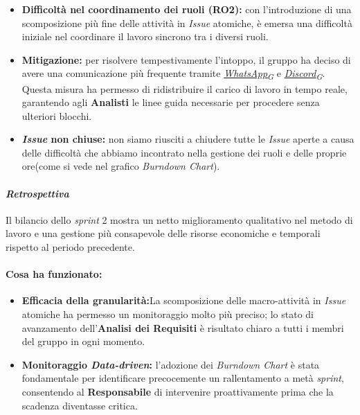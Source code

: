 \documentclass[12pt, a4paper]{article}
\newcommand{\urlglossario}{https://skynetunigroup.github.io/Code_Guardian/Documentazione/PB/glossario_v2.0.0.pdf} %
\newcommand{\glo}[2]{\href{\urlglossario\#nameddest=#2}{#1\textsubscript{G}}}
\begin{document}
{\begin{itemize}
    \item \textbf{Difficoltà nel coordinamento dei ruoli (RO2):} con l'introduzione di una scomposizione più fine delle attività in \textit{Issue} atomiche, è emersa una difficoltà iniziale nel coordinare il lavoro sincrono tra i diversi ruoli.
    \item \textbf{Mitigazione:} per risolvere tempestivamente l'intoppo, il gruppo ha deciso di avere una comunicazione più frequente tramite \textit{\glo{WhatsApp}{whatsapp}} e \textit{\glo{Discord}{discord}}. Questa misura ha permesso di ridistribuire il carico di lavoro in tempo reale, garantendo agli \textbf{Analisti} le linee guida necessarie per procedere senza ulteriori blocchi.
    \item \textbf{\textit{Issue} non chiuse:} non siamo riusciti a chiudere tutte le \textit{Issue} aperte a causa delle difficoltà che abbiamo incontrato nella gestione dei ruoli e delle proprie ore(come si vede nel grafico \textit{Burndown Chart}).
\end{itemize}

\paragraph{\textit{Retrospettiva}}
Il bilancio dello \textit{sprint} 2 mostra un netto miglioramento qualitativo nel metodo di lavoro e una gestione più consapevole delle risorse economiche e temporali rispetto al periodo precedente.

\paragraph{Cosa ha funzionato:}
\begin{itemize}
    \item \textbf{Efficacia della granularità:}La scomposizione delle macro-attività in \textit{Issue} atomiche ha permesso un monitoraggio molto più preciso;
    lo stato di avanzamento dell'\textbf{Analisi dei Requisiti} è risultato chiaro a tutti i membri del gruppo in ogni momento.
    \item \textbf{Monitoraggio \textit{Data-driven}:} l'adozione dei \textit{Burndown Chart} è stata fondamentale per identificare precocemente un rallentamento a metà \textit{sprint}, consentendo al \textbf{Responsabile} di intervenire proattivamente prima che la scadenza diventasse critica.
\end{itemize}

}
\end{document}
